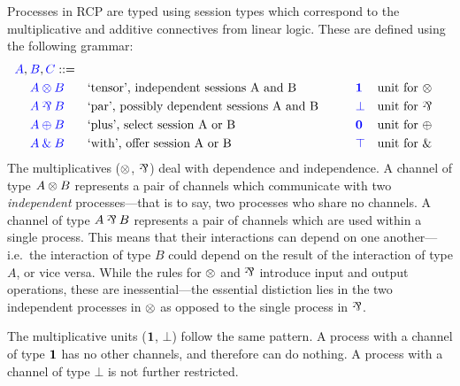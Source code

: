 \documentclass[a4paper,UKenglish]{lipics-v2016}
\begin{document}
Processes in RCP are typed using session types which correspond to the
multiplicative and additive connectives from linear logic. These are defined
using the following grammar:
\[
  \begin{aligned}
    \blue{A},\:&\blue{B},\blue{C} ::=\\
    &       \tm{A \tens B} &&\text{`tensor', independent sessions A and B}
    &\qquad&\tm{\one}      &&\text{unit for \tens}\\
    &       \tm{A \parr B} &&\text{`par', possibly dependent sessions A and B}
    &\qquad&\tm{\bot}      &&\text{unit for \parr}\\
    &       \tm{A \plus B} &&\text{`plus', select session A or B}
    &\qquad&\tm{\nil}      &&\text{unit for \plus}\\
    &       \tm{A \with B} &&\text{`with', offer session A or B}
    &\qquad&\tm{\top}      &&\text{unit for \with}
  \end{aligned}
\]
The multiplicatives ($\otimes$, $\parr$) deal with dependence and independence.
A channel of type $A \otimes B$ represents a pair of channels which communicate
with two \emph{independent} processes---that is to say, two processes who share
no channels.
A channel of type $A \parr B$ represents a pair of channels which are used
within a single process. This means that their interactions can depend on one
another---i.e.\ the interaction of type $B$ could depend on the result of the
interaction of type $A$, or vice versa.
While the rules for $\otimes$ and $\parr$ introduce input and output operations,
these are inessential---the essential distiction lies in the two independent
processes in $\otimes$ as opposed to the single process in $\parr$. 
\begin{center}
  \begin{prooftree*}
    \SYM{\tens}
  \end{prooftree*}
  \begin{prooftree*}
    \SYM{\parr}
  \end{prooftree*}
\end{center}
The multiplicative units ($\mathbf{1}$, $\bot$) follow the same pattern.
A process with a channel of type $\mathbf{1}$ has no other channels, and therefore can
do nothing.
A process with a channel of type $\bot$ is not further restricted.
\end{document}
